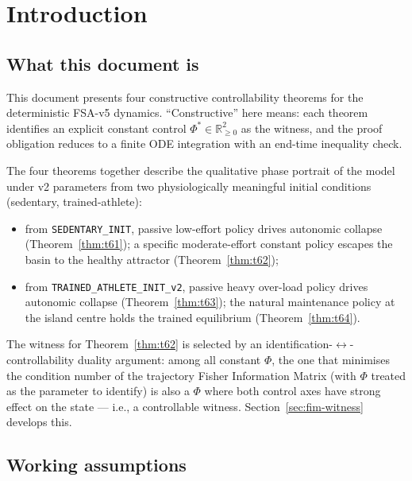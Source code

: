 \documentclass[11pt,a4paper]{article}
\theoremstyle{definition}
\newcommand{\R}{\mathbb{R}}
\begin{document}
\tableofcontents

\bigskip

\section{Introduction} \label{sec:intro}

\subsection{What this document is}

This document presents four constructive controllability theorems for the deterministic FSA-v5 dynamics. ``Constructive'' here means: each theorem identifies an explicit constant control $\Phi^* \in \R_{\ge 0}^2$ as the witness, and the proof obligation reduces to a finite ODE integration with an end-time inequality check.

The four theorems together describe the qualitative phase portrait of the model under v2 parameters from two physiologically meaningful initial conditions (sedentary, trained-athlete):

\begin{itemize}
  \item from \texttt{SEDENTARY\_INIT}, passive low-effort policy drives autonomic collapse (Theorem~\ref{thm:t61}); a specific moderate-effort constant policy escapes the basin to the healthy attractor (Theorem~\ref{thm:t62});
  \item from \texttt{TRAINED\_ATHLETE\_INIT\_v2}, passive heavy over-load policy drives autonomic collapse (Theorem~\ref{thm:t63}); the natural maintenance policy at the island centre holds the trained equilibrium (Theorem~\ref{thm:t64}).
\end{itemize}

The witness for Theorem~\ref{thm:t62} is selected by an identification-$\leftrightarrow$-controllability duality argument: among all constant $\Phi$, the one that minimises the condition number of the trajectory Fisher Information Matrix (with $\Phi$ treated as the parameter to identify) is also a $\Phi$ where both control axes have strong effect on the state — i.e., a controllable witness. Section~\ref{sec:fim-witness} develops this.

\subsection{Working assumptions}
\end{document}
